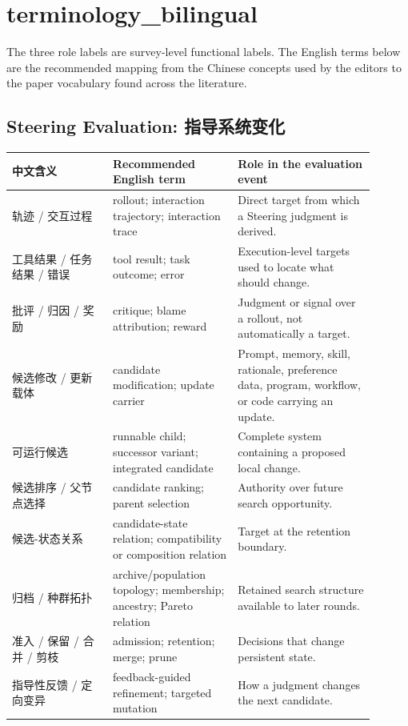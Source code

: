 \section*{terminology\_bilingual}

The three role labels are survey-level functional labels. The English terms below
are the recommended mapping from the Chinese concepts used by the editors to the
paper vocabulary found across the literature.

\subsection*{Steering Evaluation: 指导系统变化}
\begin{tabular}{p{0.25\linewidth} p{0.31\linewidth} p{0.34\linewidth}}
\textbf{中文含义} & \textbf{Recommended English term} & \textbf{Role in the evaluation event} \\
\hline
轨迹 / 交互过程 & rollout; interaction trajectory; interaction trace & Direct target from which a Steering judgment is derived. \\
工具结果 / 任务结果 / 错误 & tool result; task outcome; error & Execution-level targets used to locate what should change. \\
批评 / 归因 / 奖励 & critique; blame attribution; reward & Judgment or signal over a rollout, not automatically a target. \\
候选修改 / 更新载体 & candidate modification; update carrier & Prompt, memory, skill, rationale, preference data, program, workflow, or code carrying an update. \\
可运行候选 & runnable child; successor variant; integrated candidate & Complete system containing a proposed local change. \\
候选排序 / 父节点选择 & candidate ranking; parent selection & Authority over future search opportunity. \\
候选-状态关系 & candidate-state relation; compatibility or composition relation & Target at the retention boundary. \\
归档 / 种群拓扑 & archive/population topology; membership; ancestry; Pareto relation & Retained search structure available to later rounds. \\
准入 / 保留 / 合并 / 剪枝 & admission; retention; merge; prune & Decisions that change persistent state. \\
指导性反馈 / 定向变异 & feedback-guided refinement; targeted mutation & How a judgment changes the next candidate. \\
\end{tabular}

